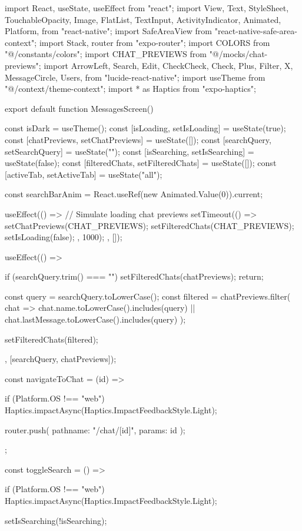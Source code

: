 import React, { useState, useEffect } from "react";
import {
  View,
  Text,
  StyleSheet,
  TouchableOpacity,
  Image,
  FlatList,
  TextInput,
  ActivityIndicator,
  Animated,
  Platform,
} from "react-native";
import { SafeAreaView } from "react-native-safe-area-context";
import { Stack, router } from "expo-router";
import { COLORS } from "@/constants/colors";
import { CHAT_PREVIEWS } from "@/mocks/chat-previews";
import {
  ArrowLeft,
  Search,
  Edit,
  CheckCheck,
  Check,
  Plus,
  Filter,
  X,
  MessageCircle,
  Users,
} from "lucide-react-native";
import { useTheme } from "@/context/theme-context";
import * as Haptics from "expo-haptics";

export default function MessagesScreen() {
  const { isDark } = useTheme();
  const [isLoading, setIsLoading] = useState(true);
  const [chatPreviews, setChatPreviews] = useState([]);
  const [searchQuery, setSearchQuery] = useState("");
  const [isSearching, setIsSearching] = useState(false);
  const [filteredChats, setFilteredChats] = useState([]);
  const [activeTab, setActiveTab] = useState("all");
  
  const searchBarAnim = React.useRef(new Animated.Value(0)).current;
  
  useEffect(() => {
    // Simulate loading chat previews
    setTimeout(() => {
      setChatPreviews(CHAT_PREVIEWS);
      setFilteredChats(CHAT_PREVIEWS);
      setIsLoading(false);
    }, 1000);
  }, []);
  
  useEffect(() => {
    if (searchQuery.trim() === "") {
      setFilteredChats(chatPreviews);
      return;
    }
    
    const query = searchQuery.toLowerCase();
    const filtered = chatPreviews.filter(
      chat => chat.name.toLowerCase().includes(query) || 
              chat.lastMessage.toLowerCase().includes(query)
    );
    
    setFilteredChats(filtered);
  }, [searchQuery, chatPreviews]);
  
  const navigateToChat = (id) => {
    if (Platform.OS !== "web") {
      Haptics.impactAsync(Haptics.ImpactFeedbackStyle.Light);
    }
    
    router.push({
      pathname: "/chat/[id]",
      params: { id }
    });
  };
  
  const toggleSearch = () => {
    if (Platform.OS !== "web") {
      Haptics.impactAsync(Haptics.ImpactFeedbackStyle.Light);
    }
    
    setIsSearching(!isSearching);
    
}}
